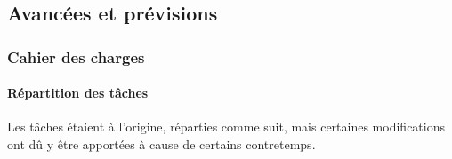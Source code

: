 \subsection{Avancées et prévisions}

    \subsubsection{Cahier des charges}

        \paragraph{Répartition des tâches}
            Les tâches étaient à l'origine, réparties comme suit, mais certaines modifications ont dû y être apportées 
            à cause de certains contretemps.

